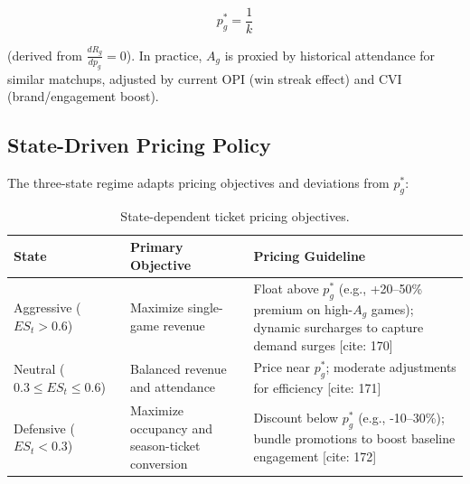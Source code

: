 \documentclass{mcmthesis}
\begin{document}
\[
p_g^* = \frac{1}{k}
\]

(derived from $\frac{d R_g}{d p_g} = 0$). In practice, $A_g$ is proxied by historical attendance for similar matchups, adjusted by current OPI (win streak effect) and CVI (brand/engagement boost).

\subsection{State-Driven Pricing Policy}
The three-state regime adapts pricing objectives and deviations from $p_g^*$:

\begin{table}[htbp]
\centering
\small %
\setlength{\tabcolsep}{4pt} %
\begin{tabularx}{\textwidth}{@{} l >{\raggedright\arraybackslash}X >{\raggedright\arraybackslash}X @{}}
\toprule
\textbf{State} & \textbf{Primary Objective} & \textbf{Pricing Guideline} \\
\midrule
\makecell[l]{Aggressive \\ ($ES_t > 0.6$)} 
& Maximize single-game revenue 
& Float above $p_g^*$ (e.g., +20--50\% premium on high-$A_g$ games); dynamic surcharges to capture demand surges [cite: 170] \\
\addlinespace[6pt]

\makecell[l]{Neutral \\ ($0.3 \leq ES_t \leq 0.6$)} 
& Balanced revenue and attendance 
& Price near $p_g^*$; moderate adjustments for efficiency [cite: 171] \\
\addlinespace[6pt]

\makecell[l]{Defensive \\ ($ES_t < 0.3$)} 
& Maximize occupancy and season-ticket conversion 
& Discount below $p_g^*$ (e.g., -10--30\%); bundle promotions to boost baseline engagement [cite: 172] \\
\bottomrule
\end{tabularx}
\caption{State-dependent ticket pricing objectives.}
\label{tab:ticket-states}
\end{table}

\end{document}
